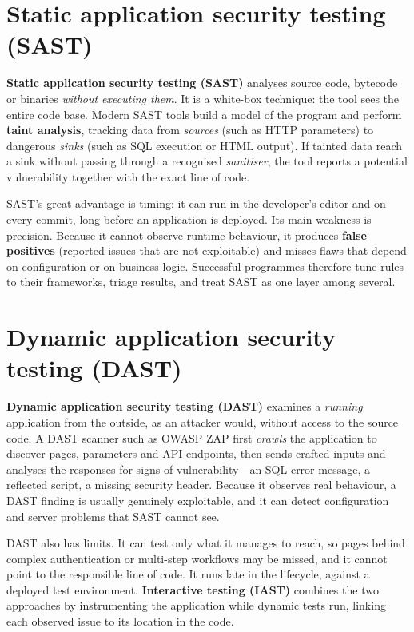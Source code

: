 \section{Static application security testing (SAST)}\label{sec:10.1}
\textbf{Static application security testing (SAST)} analyses source code, bytecode or binaries \emph{without executing them}. It is a white-box technique: the tool sees the entire code base. Modern SAST tools build a model of the program and perform \textbf{taint analysis}, tracking data from \emph{sources} (such as HTTP parameters) to dangerous \emph{sinks} (such as SQL execution or HTML output). If tainted data reach a sink without passing through a recognised \emph{sanitiser}, the tool reports a potential vulnerability together with the exact line of code.

SAST's great advantage is timing: it can run in the developer's editor and on every commit, long before an application is deployed. Its main weakness is precision. Because it cannot observe runtime behaviour, it produces \textbf{false positives} (reported issues that are not exploitable) and misses flaws that depend on configuration or on business logic. Successful programmes therefore tune rules to their frameworks, triage results, and treat SAST as one layer among several.

\section{Dynamic application security testing (DAST)}\label{sec:10.2}
\textbf{Dynamic application security testing (DAST)} examines a \emph{running} application from the outside, as an attacker would, without access to the source code. A DAST scanner such as OWASP ZAP first \emph{crawls} the application to discover pages, parameters and API endpoints, then sends crafted inputs and analyses the responses for signs of vulnerability—an SQL error message, a reflected script, a missing security header. Because it observes real behaviour, a DAST finding is usually genuinely exploitable, and it can detect configuration and server problems that SAST cannot see.

DAST also has limits. It can test only what it manages to reach, so pages behind complex authentication or multi-step workflows may be missed, and it cannot point to the responsible line of code. It runs late in the lifecycle, against a deployed test environment. \textbf{Interactive testing (IAST)} combines the two approaches by instrumenting the application while dynamic tests run, linking each observed issue to its location in the code.

